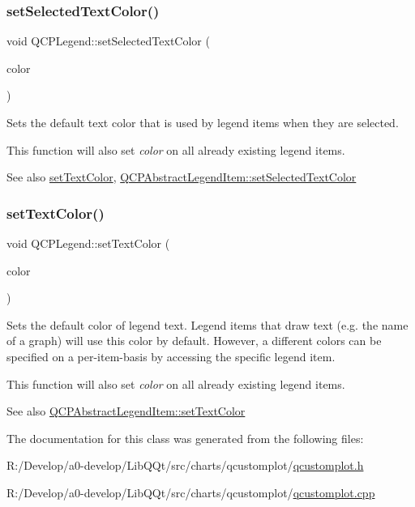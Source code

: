 \subsubsection{\texorpdfstring{set\+Selected\+Text\+Color()}{setSelectedTextColor()}}
{\footnotesize\ttfamily void Q\+C\+P\+Legend\+::set\+Selected\+Text\+Color (\begin{DoxyParamCaption}\item[{const Q\+Color \&}]{color }\end{DoxyParamCaption})}

Sets the default text color that is used by legend items when they are selected.

This function will also set {\itshape color} on all already existing legend items.

\begin{DoxySeeAlso}{See also}
\mbox{\hyperlink{class_q_c_p_legend_ae1eb239ff4a4632fe1b6c3e668d845c6}{set\+Text\+Color}}, \mbox{\hyperlink{class_q_c_p_abstract_legend_item_a4d01d008ee1a5bfe9905b0397a421936}{Q\+C\+P\+Abstract\+Legend\+Item\+::set\+Selected\+Text\+Color}} 
\end{DoxySeeAlso}
\mbox{\label{class_q_c_p_legend_ae1eb239ff4a4632fe1b6c3e668d845c6}} 
\subsubsection{\texorpdfstring{set\+Text\+Color()}{setTextColor()}}
{\footnotesize\ttfamily void Q\+C\+P\+Legend\+::set\+Text\+Color (\begin{DoxyParamCaption}\item[{const Q\+Color \&}]{color }\end{DoxyParamCaption})}

Sets the default color of legend text. Legend items that draw text (e.\+g. the name of a graph) will use this color by default. However, a different colors can be specified on a per-\/item-\/basis by accessing the specific legend item.

This function will also set {\itshape color} on all already existing legend items.

\begin{DoxySeeAlso}{See also}
\mbox{\hyperlink{class_q_c_p_abstract_legend_item_a6ebace6aaffaedcdab2d74e88acc2d1e}{Q\+C\+P\+Abstract\+Legend\+Item\+::set\+Text\+Color}} 
\end{DoxySeeAlso}


The documentation for this class was generated from the following files\+:\begin{DoxyCompactItemize}
\item 
R\+:/\+Develop/a0-\/develop/\+Lib\+Q\+Qt/src/charts/qcustomplot/\mbox{\hyperlink{qcustomplot_8h}{qcustomplot.\+h}}\item 
R\+:/\+Develop/a0-\/develop/\+Lib\+Q\+Qt/src/charts/qcustomplot/\mbox{\hyperlink{qcustomplot_8cpp}{qcustomplot.\+cpp}}\end{DoxyCompactItemize}
